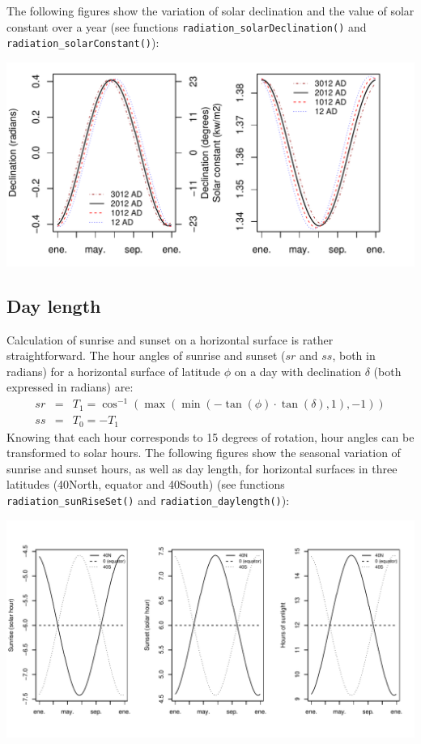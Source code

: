 \documentclass[11pt,a4paper]{article}
\begin{document}
The following figures show the variation of solar declination and the value of solar constant over a year (see functions \texttt{radiation\_solarDeclination()} and \texttt{radiation\_solarConstant()}):

\begin{center}
\includegraphics{Meteorology-010}
\end{center}

\subsection{Day length}
Calculation of sunrise and sunset on a horizontal surface is rather straightforward. The hour angles of sunrise and sunset ($sr$ and $ss$, both in radians) for a horizontal surface of latitude $\phi$ on a day with declination $\delta$ (both expressed in radians) are:
\begin{eqnarray}
sr &=& T_1 = \cos^{-1}\left(\max(\min(-\tan(\phi) \cdot \tan(\delta),1),-1)\right) \\
ss &=& T_0 = - T_1
\end{eqnarray}
Knowing that each hour corresponds to 15 degrees of rotation, hour angles can be transformed to solar hours. The following figures show the seasonal variation of sunrise and sunset hours, as well as day length, for horizontal surfaces in three latitudes (40North, equator and 40South) (see functions \texttt{radiation\_sunRiseSet()} and  \texttt{radiation\_daylength()}):
\begin{center}
\includegraphics{Meteorology-011}
\end{center}
\end{document}
